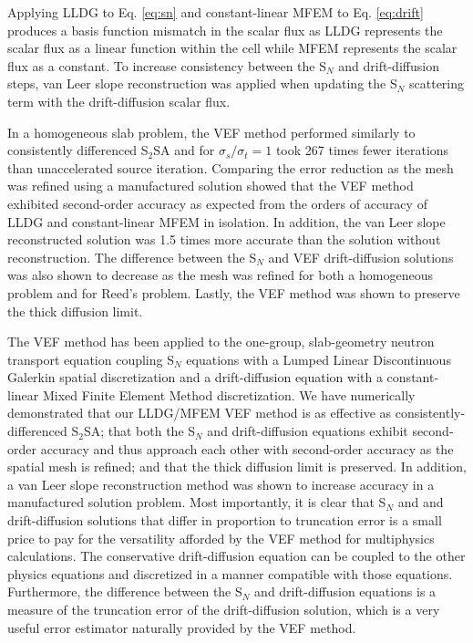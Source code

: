 \documentclass{ictt25}
\newcommand{\SN}{S$_N$\xspace}
\begin{document}
Applying LLDG to Eq. \ref{eq:sn} and constant-linear MFEM to Eq. \ref{eq:drift} produces a basis function mismatch in the scalar flux as LLDG represents the scalar flux as a linear function within the cell while MFEM represents the scalar flux as a constant. To increase consistency between the \SN and drift-diffusion steps, van Leer slope reconstruction was applied when updating the \SN scattering term with the drift-diffusion scalar flux. 

In a homogeneous slab problem, the VEF method performed similarly to consistently differenced S$_2$SA and for $\sigma_s/\sigma_t = 1$ took 267 times fewer iterations than unaccelerated source iteration. 
Comparing the error reduction as the mesh was refined using a manufactured solution showed that the VEF method exhibited second-order accuracy as expected from the orders of accuracy of LLDG and constant-linear MFEM in isolation. In addition, the van Leer slope reconstructed solution was 1.5 times more accurate than the solution without reconstruction. The difference between the \SN and VEF drift-diffusion solutions was also shown to decrease as the mesh was refined for both a homogeneous problem and for Reed's problem. Lastly, the VEF method was shown to preserve the thick diffusion limit. 

The VEF method has been applied to the one-group, slab-geometry neutron transport equation coupling \SN equations with a Lumped Linear Discontinuous Galerkin spatial discretization and a drift-diffusion equation with a constant-linear Mixed Finite Element Method discretization. We have numerically demonstrated that our LLDG/MFEM VEF method is as effective as consistently-differenced S$_2$SA; that both the \SN and drift-diffusion equations exhibit second-order accuracy and thus approach each other with second-order accuracy as the spatial mesh is refined; and that the thick diffusion limit is preserved. In addition, a van Leer slope reconstruction method was shown to increase accuracy in a manufactured solution problem. Most importantly, it is clear that \SN and and drift-diffusion solutions that differ in proportion to truncation error is a small price to pay for the versatility afforded by the VEF method for multiphysics calculations. The conservative drift-diffusion equation can be coupled to the other physics equations and discretized in a manner compatible with those equations.  Furthermore, the difference between the \SN and drift-diffusion equations is a measure of the truncation error of the drift-diffusion solution, which is a very useful error estimator naturally provided by the VEF method.  

\setlength{\baselineskip}{12pt}


\end{document}
